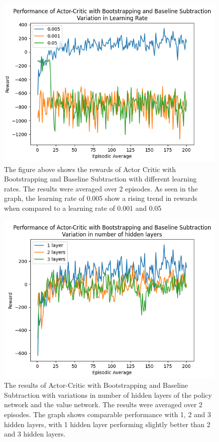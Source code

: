 \documentclass{article}
\begin{document}
\begin{figure}[h!]
\centering
\includegraphics[width=0.9\linewidth]{Report/images/10.Performance_of_Actor_Critic_BSandBS_LR.png}
\caption{\label{fig:ActorCriticBS2-different learning rates}The figure above shows the rewards of Actor Critic with Bootstrapping and Baseline Subtraction with different learning rates. The results were averaged over 2 episodes. As seen in the graph, the learning rate of 0.005 show a rising trend in rewards when compared to a learning rate of 0.001 and 0.05}
\end{figure}

\begin{figure}[h!]
\centering
\includegraphics[width=0.9\linewidth]{Report/images/11.Performance_of_Actor_Critic_BSandBS_Layers.png}
\caption{\label{fig:ActorCriticBS2-different neurons}The results of Actor-Critic with Bootstrapping and Baseline Subtraction with variations in number of hidden layers of the policy network and the value network. The results were averaged over 2 episodes. The graph shows comparable performance with 1, 2 and 3 hidden layers, with 1 hidden layer performing slightly better than 2 and 3 hidden layers. }
\end{figure}
\end{document}
